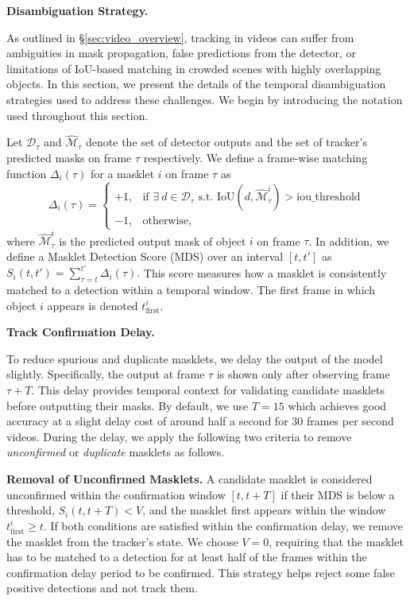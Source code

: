 \documentclass[]{fairmeta}
\renewcommand{\paragraph}[1]{%
	\noindent\textbf{#1.}\noindent\xspace%
}
\begin{document}
\paragraph{Disambiguation Strategy}
As outlined in \S\ref{sec:video_overview}, tracking in videos can suffer from ambiguities in mask propagation, false predictions from the detector, or limitations of IoU-based matching in crowded scenes with highly overlapping objects. In this section, we present the details of the temporal disambiguation strategies used to address these challenges. We begin by introducing the notation used throughout this section.

Let $\mathcal{D}_\tau$ and $\mathcal{\hat{M}}_\tau$ denote the set of detector outputs and the set of tracker's predicted masks on frame $\tau$ respectively. We define a frame-wise matching function 
$\Delta_i(\tau)$ for a masklet $i$ on frame $\tau$ as
\[
\Delta_i(\tau) =
\begin{cases} 
	+1, & \text{if } \exists~d \in \mathcal{D}_\tau \text{ s.t. } \mathrm{IoU}(d, \mathcal{\hat{M}}^i_\tau) > \mathrm{iou\_threshold} \\
	
	
	-1, & \text{otherwise},
\end{cases}
\]
where $\mathcal{\hat{M}}^i_\tau$ is the predicted output mask of object $i$ on frame $\tau$. In addition, we define a Masklet Detection Score (MDS) over an interval $[t,t']$ as $S_i(t, t') = \sum_{\tau=t}^{t'} \Delta_i(\tau).$ This score measures how a masklet is consistently matched to a detection within a temporal window. The first frame in which object $i$ appears is denoted $t_\text{first}^i$.


\paragraph{Track Confirmation Delay}
To reduce spurious and duplicate masklets, we delay the output of the model slightly. Specifically, the output at frame $\tau$ is shown only after observing frame $\tau+T$. This delay provides temporal context for validating candidate masklets before outputting their masks. By default, we use $T=15$ which achieves good accuracy at a slight delay cost of around half a second for $30$ frames per second videos. During the delay, we apply the following two criteria to remove \textit{unconfirmed} or \textit{duplicate} masklets as follows.

\paragraph{Removal of Unconfirmed Masklets} A candidate masklet is considered unconfirmed within the confirmation window $[t, t+T]$ if their MDS is below a threshold, $S_i(t, t+T) < V$, and the masklet first appears within the window $t_\text{first}^i \geq t$. If both conditions are satisfied within the confirmation delay, we remove the masklet from the tracker's state. We choose $V=0$, requiring that the masklet has to be matched to a detection for at least half of the frames within the confirmation delay period to be confirmed. This strategy helps reject some false positive detections and not track them.
\end{document}
